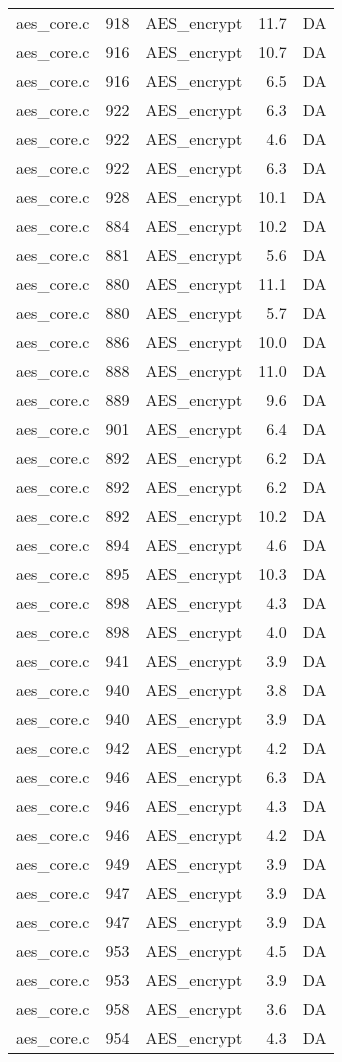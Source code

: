 \begin{table}[h!]
\begin{tabular}{lrlrr}
aes\_core.c& 918&AES\_encrypt&11.7 &DA\\
aes\_core.c& 916&AES\_encrypt&10.7 &DA\\
aes\_core.c& 916&AES\_encrypt&6.5 &DA\\
aes\_core.c& 922&AES\_encrypt&6.3 &DA\\
aes\_core.c& 922&AES\_encrypt&4.6 &DA\\
aes\_core.c& 922&AES\_encrypt&6.3 &DA\\
aes\_core.c& 928&AES\_encrypt&10.1 &DA\\
aes\_core.c& 884&AES\_encrypt&10.2 &DA\\
aes\_core.c& 881&AES\_encrypt&5.6 &DA\\
aes\_core.c& 880&AES\_encrypt&11.1 &DA\\
aes\_core.c& 880&AES\_encrypt&5.7 &DA\\
aes\_core.c& 886&AES\_encrypt&10.0 &DA\\
aes\_core.c& 888&AES\_encrypt&11.0 &DA\\
aes\_core.c& 889&AES\_encrypt&9.6 &DA\\
aes\_core.c& 901&AES\_encrypt&6.4 &DA\\
aes\_core.c& 892&AES\_encrypt&6.2 &DA\\
aes\_core.c& 892&AES\_encrypt&6.2 &DA\\
aes\_core.c& 892&AES\_encrypt&10.2 &DA\\
aes\_core.c& 894&AES\_encrypt&4.6 &DA\\
aes\_core.c& 895&AES\_encrypt&10.3 &DA\\
aes\_core.c& 898&AES\_encrypt&4.3 &DA\\
aes\_core.c& 898&AES\_encrypt&4.0 &DA\\
aes\_core.c& 941&AES\_encrypt&3.9 &DA\\
aes\_core.c& 940&AES\_encrypt&3.8 &DA\\
aes\_core.c& 940&AES\_encrypt&3.9 &DA\\
aes\_core.c& 942&AES\_encrypt&4.2 &DA\\
aes\_core.c& 946&AES\_encrypt&6.3 &DA\\
aes\_core.c& 946&AES\_encrypt&4.3 &DA\\
aes\_core.c& 946&AES\_encrypt&4.2 &DA\\
aes\_core.c& 949&AES\_encrypt&3.9 &DA\\
aes\_core.c& 947&AES\_encrypt&3.9 &DA\\
aes\_core.c& 947&AES\_encrypt&3.9 &DA\\
aes\_core.c& 953&AES\_encrypt&4.5 &DA\\
aes\_core.c& 953&AES\_encrypt&3.9 &DA\\
aes\_core.c& 958&AES\_encrypt&3.6 &DA\\
aes\_core.c& 954&AES\_encrypt&4.3 &DA\\
\hline
\end{tabular}
\renewcommand{\baselinestretch}{1.0}\selectfont
\end{table}

